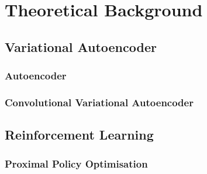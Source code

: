 \chapter{Theoretical Background}
\label{chap:2_background}



\section{Variational Autoencoder}

\subsection{Autoencoder}

\subsection{Convolutional Variational Autoencoder}


\section{Reinforcement Learning}

\subsection{Proximal Policy Optimisation}
